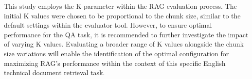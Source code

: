 This study employs the K parameter within the \ac{RAG} evaluation process.
The initial K values were chosen to be proportional to the chunk size, similar to the default settings within the evaluator tool.
However, to ensure optimal performance for the \ac{QA} task, it is recommended to further investigate the impact of varying K values.
Evaluating a broader range of K values alongside the chunk size variations will enable the identification of the optimal configuration for maximizing RAG's performance within the context of this specific English technical document retrieval task.




